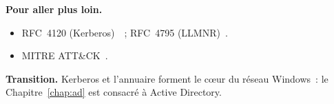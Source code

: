 \bigskip

\begin{boxinfo}
\textbf{Pour aller plus loin.}
\begin{itemize}
    \item RFC~4120 (Kerberos)~\cite{rfc4120}~; RFC~4795 (LLMNR)~\cite{rfc4795}.
    \item MITRE ATT\&CK~\cite{mitreattack}.
\end{itemize}
\end{boxinfo}

\begin{boxinfo}
\textbf{Transition.} Kerberos et l'annuaire forment le cœur du réseau
Windows~: le Chapitre~\ref{chap:ad} est consacré à Active Directory.
\end{boxinfo}
